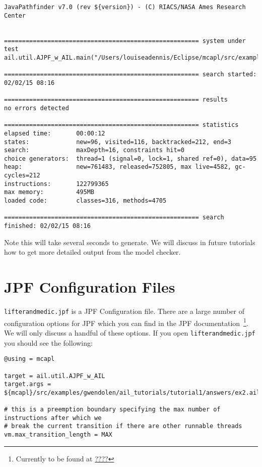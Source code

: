 \documentclass[a4]{article}
\begin{document}
\begin{verbatim}
JavaPathfinder v7.0 (rev ${version}) - (C) RIACS/NASA Ames Research Center


====================================================== system under test
ail.util.AJPF_w_AIL.main("/Users/louiseadennis/Eclipse/mcapl/src/examples/gwendolen/ail_tutorials/tutorial1/answers/ex2.ail","/Users/louiseadennis/Eclipse/mcapl/src/examples/gwendolen/ajpf_tutorials/tutorial1/lifterandmedic.psl","1")

====================================================== search started: 02/02/15 08:16

====================================================== results
no errors detected

====================================================== statistics
elapsed time:       00:00:12
states:             new=96, visited=116, backtracked=212, end=3
search:             maxDepth=16, constraints hit=0
choice generators:  thread=1 (signal=0, lock=1, shared ref=0), data=95
heap:               new=761483, released=752805, max live=4582, gc-cycles=212
instructions:       122799365
max memory:         495MB
loaded code:        classes=316, methods=4705

====================================================== search finished: 02/02/15 08:16
\end{verbatim}

Note this will take several seconds to generate.  We will discuss in future tutorials how to get more detailed output from the model checker.

\section{JPF Configuration Files}

\texttt{lifterandmedic.jpf} is a JPF Configuration file.  There are a large number of configuration options for JPF which you can find in the JPF documentation~\footnote{Currently to be found at \url{????}}.  We will only discuss a handful of these options.  If you open \texttt{lifterandmedic.jpf} you should see the following:

\begin{verbatim}
@using = mcapl

target = ail.util.AJPF_w_AIL
target.args = ${mcapl}/src/examples/gwendolen/ail_tutorials/tutorial1/answers/ex2.ail,${mcapl}/src/examples/gwendolen/ajpf_tutorials/tutorial1/lifterandmedic.psl,1

# this is a preemption boundary specifying the max number of instructions after which we
# break the current transition if there are other runnable threads
vm.max_transition_length = MAX
\end{verbatim}
\end{document}
